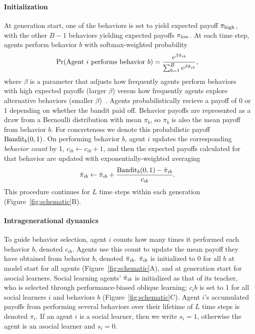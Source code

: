 \documentclass[letterpaper,11.5pt]{scrartcl}
\begin{document}
\paragraph{Initialization}
At generation start, one of the behaviors is set to 
yield expected payoff $\pi_{\mathrm{high}}$, with the other $B-1$ behaviors yielding
expected payoffs $\pi_{\mathrm{low}}$. At each time step, agents perform behavior $b$ 
with softmax-weighted probability
\begin{equation}
  \Pr(\text{Agent $i$ performs behavior $b$}) = 
    \frac{e^{\beta \bar\pi_{ib}}}{\sum_{b=1}^B e^{\beta \bar\pi_{ib}}},
\end{equation}
\noindent
where $\beta$ is a parameter that adjusts how frequently agents perform 
behaviors with high expected payoffs (larger $\beta$) versus how frequently
agents explore alternative behaviors (smaller $\beta$)~\cite{McElreath2005}. 
Agents probabilistically recieve a payoff of 0 or 1 depending on whether the
bandit paid off. Behavior payoffs are represented as a draw from a 
Bernoulli distribution with mean $\pi_b$, so $\pi_b$ is also the mean payoff from
behavior $b$.  For concreteness we denote this probabilistic payoff
$\text{Bandit}_b(0, 1)$. On performing behavior $b$, agent $i$ updates the
corresponding \emph{behavior count} by 1, $c_{ib} \leftarrow c_{ib} + 1$, and then
the expected payoffs calculated for that behavior are updated with
exponentially-weighted averaging
\begin{equation}
  \bar\pi_{ib} \leftarrow \bar\pi_{ib} + \frac{\text{Bandit}_b(0, 1) - \bar\pi_{ib}}{c_{ib}}.
\end{equation}
\noindent
This procedure continues for $L$ time steps within each generation
(Figure~\ref{fig:schematic}B).


\paragraph{Intragenerational dynamics}
To guide behavior selection, agent $i$ counts how many times it
performed each behavior $b$, denoted $c_{ib}$. Agents use this count to 
update the mean payoff they have obtained from behavior $b$, denoted $\bar\pi_{ib}$.
$\bar\pi_{ib}$ is initialized to 0 for all $b$ at model start for
all agents (Figure~\ref{fig:schematic}A), and at 
generation start for asocial learners. Social
learning agents' $\bar\pi_{ib}$ is initialized as that of its teacher, who is selected
through performance-biased oblique learning; $c_ib$ is set to 1 for all social
learners $i$ and behaviors $b$ (Figure~\ref{fig:schematic}C). Agent $i$'s
accumulated payoffs from performing several behaviors over their lifetime of $L$
time steps is denoted $\pi_{i}$. If an agent $i$ is a social learner, then we write
$s_i = 1$, otherwise the agent is an asocial learner and $s_i = 0$.
\end{document}
